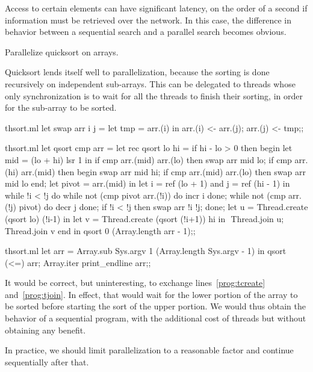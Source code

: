 Access to certain elements can have significant latency, on the order
of a second if information must be retrieved over the network.  In
this case, the difference in behavior between a sequential search and
a parallel search becomes obvious.
\medskip
\begin{exercise}
\label{ex/qsort}
Parallelize quicksort on arrays.
\end{exercise}
\begin{answer}
Quicksort lends itself well to parallelization, because the sorting is
done recursively on independent sub-arrays.  This can be delegated to
threads whose only synchronization is to wait for all the threads to
finish their sorting, in order for the sub-array to be sorted.

\begin{codefile}{thsort.ml}
let swap arr i j =
  let tmp = arr.(i) in
  arr.(i) <- arr.(j);
  arr.(j) <- tmp;;
\end{codefile}
\begin{listingcodefile}[style=numbers]{thsort.ml}
let qsort cmp arr =
  let rec qsort lo hi = 
  if hi - lo > 0 then
    begin
      let mid = (lo + hi) lsr 1 in
      if cmp arr.(mid) arr.(lo) then swap arr mid lo;
      if cmp arr.(hi) arr.(mid) then
        begin
          swap arr mid hi;
          if cmp arr.(mid) arr.(lo) then swap arr mid lo
        end;
      let pivot = arr.(mid) in
      let i = ref (lo + 1) and j = ref (hi - 1) in
      while !i < !j do
        while not (cmp pivot arr.(!i)) do incr i done;
        while not (cmp arr.(!j) pivot) do decr j done;
        if !i < !j then swap arr !i !j; 
      done;
      let u = Thread.create (qsort lo) (!i-1) in
      let v = Thread.create (qsort (!i+1)) hi in $\label{prog:tcreate}$
      Thread.join u; $\label{prog:tjoin}$
      Thread.join v
    end in
  qsort 0 (Array.length arr - 1);;
\end{listingcodefile}
%
\begin{codefile}{thsort.ml}
let arr = Array.sub Sys.argv 1 (Array.length Sys.argv - 1) in
qsort (<=) arr; 
Array.iter print_endline arr;;
\end{codefile}
%
It would be correct, but uninteresting, to exchange
lines~\ref{prog:tcreate} and~\ref{prog:tjoin}.
In effect, that would wait for the lower portion of the array to be
sorted before starting the sort of the upper portion.  We would thus
obtain the behavior of a sequential program, with the additional cost
of threads but without obtaining any benefit.

In practice, we should limit parallelization to a reasonable factor
and continue sequentially after that.
\end{answer}

